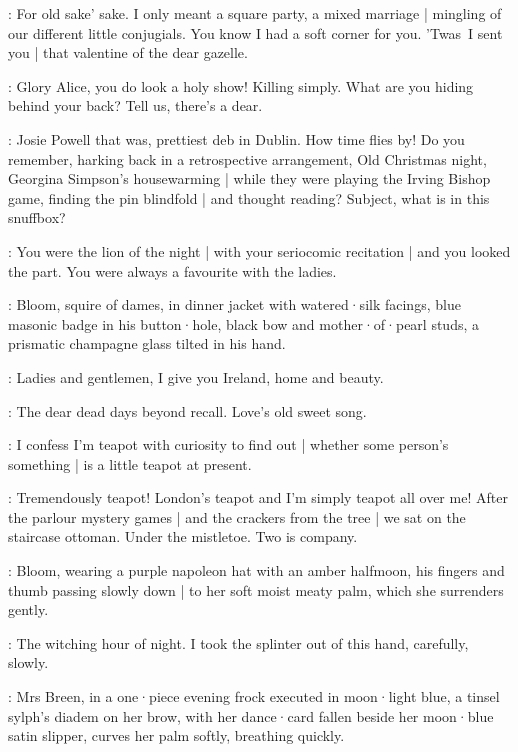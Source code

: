 \Bloom:
For old sake' sake.
I only meant a square party,
a mixed marriage |
mingling of our different little conjugials.
You know I had a soft corner for you.
'Twas~I sent you |
that valentine of the dear gazelle.

\MrsBreen:
Glory Alice,
you do look a holy show!
Killing simply.
What are you hiding behind your back?
Tell us,
there's a dear.

\Bloom:
Josie Powell that was,
prettiest deb in Dublin.
How time flies by!
Do you remember,
harking back in a retrospective arrangement,
Old Christmas night,
Georgina Simpson's housewarming |
while they were playing the Irving Bishop game,
finding the pin blindfold |
and thought reading?
Subject,
what is in this snuffbox?

\MrsBreen:
You were the lion of the night |
with your seriocomic recitation |
and you looked the part.
You were always a favourite with the ladies.

:
Bloom,
squire of dames,
in dinner jacket with watered·silk facings,
blue masonic badge in his button·hole,
black bow and mother·of·pearl studs,
a prismatic champagne glass tilted in his hand.

\Bloom:
Ladies and gentlemen,
I give you Ireland,
home and beauty.

\MrsBreen:
The dear dead days beyond recall.
Love's old sweet song.

\Bloom:
I confess I'm teapot with curiosity to find out |
whether some person's something |
is a little teapot at present.

\MrsBreen:
Tremendously teapot!
London's teapot and I'm simply teapot all over me!
After the parlour mystery games |
and the crackers from the tree |
we sat on the staircase ottoman.
Under the mistletoe.
Two is company.

:
Bloom,
wearing a purple napoleon hat with an amber halfmoon,
his fingers and thumb passing slowly down |
to her soft moist meaty palm,
which she surrenders gently.

\Bloom:
The witching hour of night.
I took the splinter out of this hand,
carefully,
slowly.

:
Mrs Breen,
in a one·piece evening frock executed in moon·light blue,
a tinsel sylph's diadem on her brow,
with her dance·card fallen beside her moon·blue satin slipper,
curves her palm softly,
breathing quickly.

